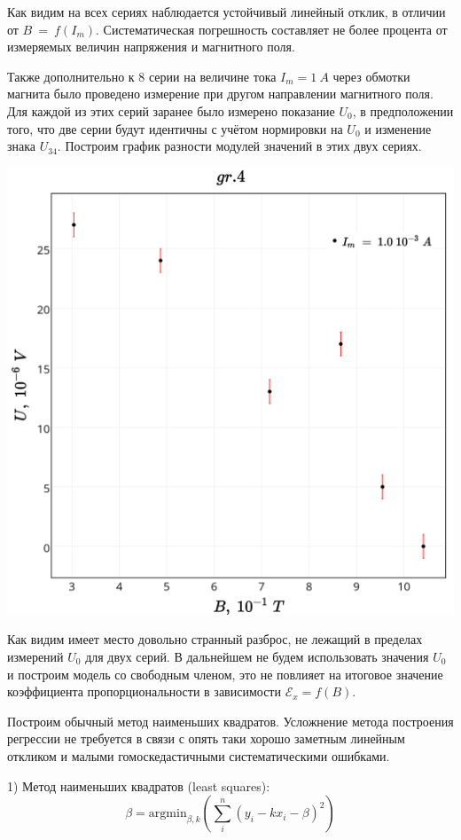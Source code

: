 Как видим на всех сериях наблюдается устойчивый линейный отклик, в отличии от $B~=~f(I_m)$. Систематическая погрешность составляет не более процента от измеряемых величин напряжения и магнитного поля. 

Также дополнительно к 8 серии на величине тока $I_m=1~A$ через обмотки магнита было проведено измерение при другом направлении магнитного поля. Для каждой из этих серий заранее было измерено показание $U_0$, в предположении того, что две серии будут идентичны с учётом нормировки на $U_0$ и изменение знака $U_{34}$. Построим график разности модулей значений в этих двух сериях.

\includegraphics[scale = 0.20]{my_plot4.png}

Как видим имеет место довольно странный разброс, не лежащий в пределах измерений $U_0$ для двух серий. В дальнейшем не будем использовать значения $U_0$ и построим модель со свободным членом, это не повлияет на итоговое значение коэффициента пропорциональности в зависимости $\mathscr{E}_x = f(B)$.

Построим обычный метод наименьших квадратов. Усложнение метода построения регрессии не требуется в связи с опять таки хорошо заметным линейным откликом и малыми гомоскедастичными систематическими ошибками. 

1) Метод наименьших квадратов (least squares):
$$ \beta = \text{argmin}_{\beta, k}(\sum_i^n (y_i - k x_i - \beta)^2) $$

